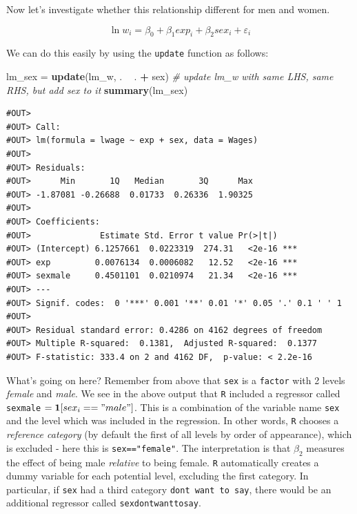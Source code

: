 \documentclass[]{book}
\newenvironment{Shaded}{\begin{snugshade}}{\end{snugshade}}
\newcommand{\KeywordTok}[1]{\textcolor[rgb]{0.13,0.29,0.53}{\textbf{#1}}}
\newcommand{\StringTok}[1]{\textcolor[rgb]{0.31,0.60,0.02}{#1}}
\newcommand{\CommentTok}[1]{\textcolor[rgb]{0.56,0.35,0.01}{\textit{#1}}}
\newcommand{\OperatorTok}[1]{\textcolor[rgb]{0.81,0.36,0.00}{\textbf{#1}}}
\newcommand{\NormalTok}[1]{#1}
\theoremstyle{definition}
\theoremstyle{definition}
\theoremstyle{definition}
\theoremstyle{remark}
\begin{document}
Now let's investigate whether this relationship different for men and
women.

\[
\ln w_i = \beta_0 + \beta_1 exp_i + \beta_2 sex_i + \varepsilon_i \label{eq:wage-sex}
\]

We can do this easily by using the \texttt{update} function as follows:

\begin{Shaded}
\begin{Highlighting}[]
\NormalTok{lm_sex =}\StringTok{ }\KeywordTok{update}\NormalTok{(lm_w, . }\OperatorTok{~}\StringTok{ }\NormalTok{. }\OperatorTok{+}\StringTok{ }\NormalTok{sex)  }\CommentTok{# update lm_w with same LHS, same RHS, but add sex to it}
\KeywordTok{summary}\NormalTok{(lm_sex)}
\end{Highlighting}
\end{Shaded}

\begin{verbatim}
#OUT> 
#OUT> Call:
#OUT> lm(formula = lwage ~ exp + sex, data = Wages)
#OUT> 
#OUT> Residuals:
#OUT>      Min       1Q   Median       3Q      Max 
#OUT> -1.87081 -0.26688  0.01733  0.26336  1.90325 
#OUT> 
#OUT> Coefficients:
#OUT>              Estimate Std. Error t value Pr(>|t|)    
#OUT> (Intercept) 6.1257661  0.0223319  274.31   <2e-16 ***
#OUT> exp         0.0076134  0.0006082   12.52   <2e-16 ***
#OUT> sexmale     0.4501101  0.0210974   21.34   <2e-16 ***
#OUT> ---
#OUT> Signif. codes:  0 '***' 0.001 '**' 0.01 '*' 0.05 '.' 0.1 ' ' 1
#OUT> 
#OUT> Residual standard error: 0.4286 on 4162 degrees of freedom
#OUT> Multiple R-squared:  0.1381,  Adjusted R-squared:  0.1377 
#OUT> F-statistic: 333.4 on 2 and 4162 DF,  p-value: < 2.2e-16
\end{verbatim}

What's going on here? Remember from above that \texttt{sex} is a
\texttt{factor} with 2 levels \emph{female} and \emph{male}. We see in
the above output that \texttt{R} included a regressor called
\texttt{sexmale} \(=\mathbf{1}[sex_i=="male"]\). This is a combination
of the variable name \texttt{sex} and the level which was included in
the regression. In other words, \texttt{R} chooses a \emph{reference
category} (by default the first of all levels by order of appearance),
which is excluded - here this is \texttt{sex=="female"}. The
interpretation is that \(\beta_2\) measures the effect of being male
\emph{relative} to being female. \texttt{R} automatically creates a
dummy variable for each potential level, excluding the first category.
In particular, if \texttt{sex} had a third category
\texttt{dont\ want\ to\ say}, there would be an additional regressor
called \texttt{sexdontwanttosay}.
\end{document}
